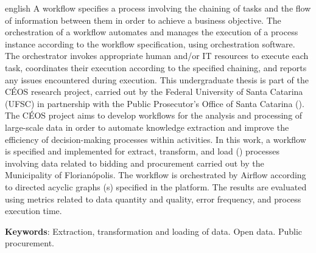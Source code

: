 \documentclass[
	12pt,				%
	oneside,			%
	a4paper,			%
	chapter=TITLE,		%
	section=TITLE,		%
	english,			%
	brazil				%
	]{abntex2}
\begin{document}
\begin{resumo}[Abstract]
	\SingleSpacing
	\begin{otherlanguage*}{english}
		A workflow specifies a process involving the chaining of tasks and the flow of information between them in order to achieve a business objective. The orchestration of a workflow automates and manages the execution of a process instance according to the workflow specification, using orchestration software. The orchestrator invokes appropriate human and/or IT resources to execute each task, coordinates their execution according to the specified chaining, and reports any issues encountered during execution. This undergraduate thesis is part of the CÉOS research project, carried out by the Federal University of Santa Catarina (UFSC) in partnership with the Public Prosecutor's Office of Santa Catarina (). The CÉOS project aims to develop workflows for the analysis and processing of large-scale data in order to automate knowledge extraction and improve the efficiency of decision-making processes within  activities. In this work, a workflow is specified and implemented for extract, transform, and load () processes involving data related to bidding and procurement carried out by the Municipality of Florianópolis. The workflow is orchestrated by Airflow according to directed acyclic graphs (s) specified in the platform. The results are evaluated using metrics related to data quantity and quality, error frequency, and  process execution time.
		
		\textbf{Keywords}: Extraction, transformation and loading of data. Open data. Public procurement.
	\end{otherlanguage*}
\end{resumo}

% 
%
%  
\end{document}
